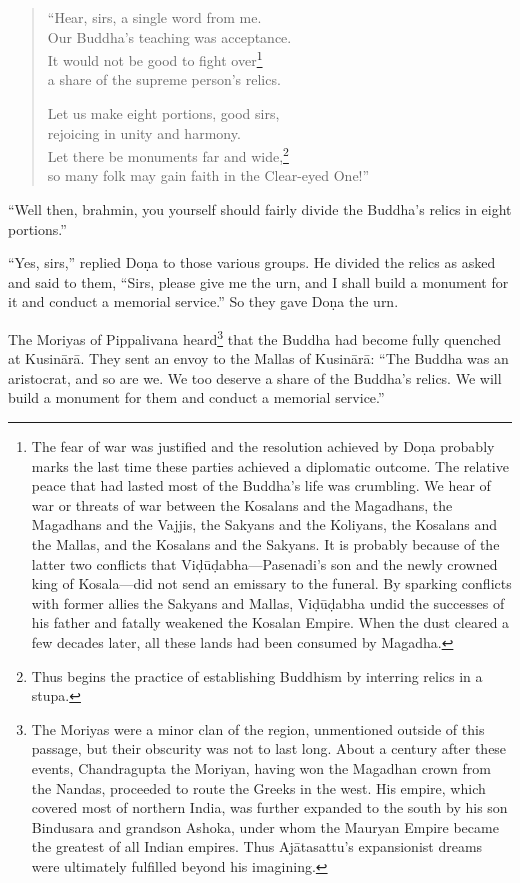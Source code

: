 \documentclass[12pt,openany]{book}%
\begin{document}
\begin{verse}%
“Hear, sirs, a single word from me. \\
Our Buddha’s teaching was acceptance. \\
It would not be good to fight over\footnote{The fear of war was justified and the resolution achieved by \textsanskrit{Doṇa} probably marks the last time these parties achieved a diplomatic outcome. The relative peace that had lasted most of the Buddha’s life was crumbling. We hear of war or threats of war between the Kosalans and the Magadhans, the Magadhans and the Vajjis, the Sakyans and the Koliyans, the Kosalans and the Mallas, and the Kosalans and the Sakyans. It is probably because of the latter two conflicts that \textsanskrit{Viḍūḍabha}—Pasenadi’s son and the newly crowned king of Kosala—did not send an emissary to the funeral. By sparking conflicts with former allies the Sakyans and Mallas, \textsanskrit{Viḍūḍabha} undid the successes of his father and fatally weakened the Kosalan Empire. When the dust cleared a few decades later, all these lands had been consumed by Magadha. } \\
a share of the supreme person’s relics. 

Let us make eight portions, good sirs, \\
rejoicing in unity and harmony. \\
Let there be monuments far and wide,\footnote{Thus begins the practice of establishing Buddhism by interring relics in a stupa. } \\
so many folk may gain faith in the Clear-eyed One!” 

%
\end{verse}

“Well then, brahmin, you yourself should fairly divide the Buddha’s relics in eight portions.” 

“Yes, sirs,” replied \textsanskrit{Doṇa} to those various groups. He divided the relics as asked and said to them, “Sirs, please give me the urn, and I shall build a monument for it and conduct a memorial service.” So they gave \textsanskrit{Doṇa} the urn. 

The Moriyas of Pippalivana heard\footnote{The Moriyas were a minor clan of the region, unmentioned outside of this passage, but their obscurity was not to last long. About a century after these events, Chandragupta the Moriyan, having won the Magadhan crown from the Nandas, proceeded to route the Greeks in the west. His empire, which covered most of northern India, was further expanded to the south by his son Bindusara and grandson Ashoka, under whom the Mauryan Empire became the greatest of all Indian empires. Thus \textsanskrit{Ajātasattu}’s expansionist dreams were ultimately fulfilled beyond his imagining. } that the Buddha had become fully quenched at \textsanskrit{Kusinārā}. They sent an envoy to the Mallas of \textsanskrit{Kusinārā}: “The Buddha was an aristocrat, and so are we. We too deserve a share of the Buddha’s relics. We will build a monument for them and conduct a memorial service.” 
\end{document}

